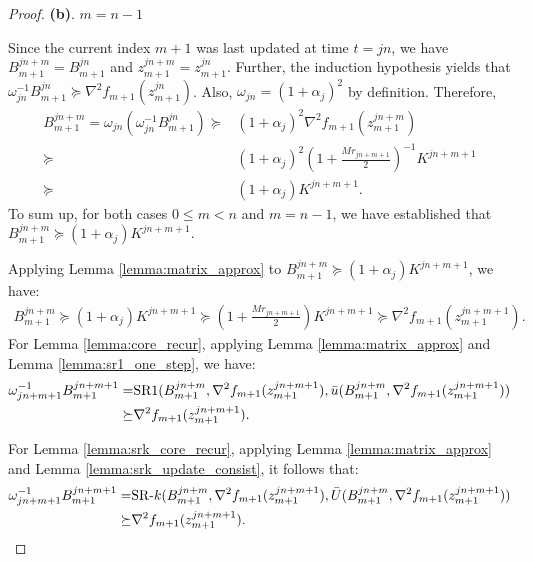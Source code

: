 \begin{proof}
    \textbf{(b)}. $m = n - 1$

    Since the current index $m + 1$ was last updated at time $t = j n$, we have $B_{m + 1}^{j n + m} = B_{m + 1}^{j n}$ and $z_{m + 1}^{j n + m} = z_{m + 1}^{j n}$. Further, the induction hypothesis yields that $\omega_{j n}^{-1} B_{m+1}^{j n} \succeq \nabla^2 f_{m+1} (z_{m + 1}^{j n})$. Also, $\omega_{j n} = (1 + \alpha_j)^2$ by definition. Therefore,
    \begin{align*}
        B_{m+1}^{j n + m} = \omega_{j n} (\omega_{j n}^{-1} B_{m + 1}^{j n}) \succeq& (1 + \alpha_j)^2 \nabla^2 f_{m+1}(z_{m+1}^{j n + m}) \\
        \succeq & (1 + \alpha_j)^2 (1 + \frac{M r_{j n + m + 1}}{2})^{-1} K^{j n + m + 1} \\
        \succeq & (1 + \alpha_j) K^{j n + m + 1}.
    \end{align*}
    To sum up, for both cases $0 \leq m < n$ and $m = n - 1$, we have established that $B_{m+1}^{j n + m} \succeq (1 + \alpha_j) K^{j n + m + 1}$.

    Applying Lemma \ref{lemma:matrix_approx} to $B_{m+1}^{j n + m} \succeq (1 + \alpha_j)K^{j n + m + 1}$, we have:
    \begin{align*}
        B_{m+1}^{j n + m} \succeq (1 + \alpha_j) K^{j n + m + 1} \succeq \left(1 + \frac{M r_{j n + m + 1}}{2} \right) K^{j n + m + 1} \succeq \nabla^2 f_{m+1}(z_{m+1}^{j n + m + 1}).
    \end{align*}
    For Lemma \ref{lemma:core_recur}, applying Lemma \ref{lemma:matrix_approx} and Lemma \ref{lemma:sr1_one_step}, we have:
    \begin{align*}
        \omega_{j n + m + 1}^{-1} B_{m + 1}^{j n + m + 1} = & \mathrm{SR1} (B_{m+1}^{j n + m}, \nabla^2 f_{m+1} (z_{m+1}^{j n + m + 1}), \Bar{u}(B_{m+1}^{j n + m}, \nabla^2 f_{m+1} (z_{m+1}^{j n + m + 1}) ) \\
        \succeq & \nabla^2 f_{m+1} (z_{m+1}^{j n + m + 1}).
    \end{align*}

    For Lemma \ref{lemma:srk_core_recur}, applying Lemma \ref{lemma:matrix_approx} and Lemma \ref{lemma:srk_update_consist}, it follows that:
    \begin{align*}
        \omega_{j n + m + 1}^{-1} B_{m + 1}^{j n + m + 1} = & \mathrm{SR}\textrm{-}k (B_{m+1}^{j n + m}, \nabla^2 f_{m+1} (z_{m+1}^{j n + m + 1}), \Bar{U}(B_{m+1}^{j n + m}, \nabla^2 f_{m+1} (z_{m+1}^{j n + m + 1}) ) \\
        \succeq & \nabla^2 f_{m+1} (z_{m+1}^{j n + m + 1}).
    \end{align*}


\end{proof}
